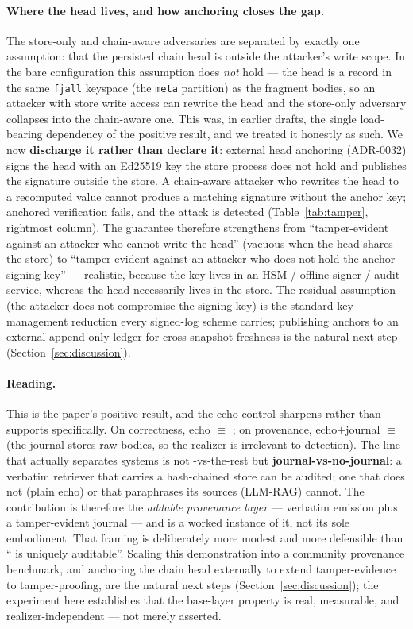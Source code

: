 \paragraph{Where the head lives, and how anchoring closes the
gap.} The store-only and chain-aware adversaries are separated by
exactly one assumption: that the persisted chain head is outside
the attacker's write scope. In the bare configuration this
assumption does \emph{not} hold --- the head is a record in the
same \texttt{fjall} keyspace (the \texttt{meta} partition) as the
fragment bodies, so an attacker with store write access can
rewrite the head and the store-only adversary collapses into the
chain-aware one. This was, in earlier drafts, the single
load-bearing dependency of the positive result, and we treated it
honestly as such. We now \textbf{discharge it rather than
declare it}: external head anchoring (ADR-0032) signs the head with
an Ed25519 key the store process does not hold and publishes the
signature outside the store. A chain-aware attacker who rewrites
the head to a recomputed value cannot produce a matching signature
without the anchor key; anchored verification fails, and the
attack is detected (Table~\ref{tab:tamper}, rightmost column). The
guarantee therefore strengthens from ``tamper-evident against an
attacker who cannot write the head'' (vacuous when the head shares
the store) to ``tamper-evident against an attacker who does not
hold the anchor signing key'' --- realistic, because the key lives
in an HSM / offline signer / audit service, whereas the head
necessarily lives in the store. The residual assumption (the
attacker does not compromise the signing key) is the standard key-
management reduction every signed-log scheme carries; publishing
anchors to an external append-only ledger for cross-snapshot
freshness is the natural next step (Section~\ref{sec:discussion}).

\paragraph{Reading.} This is the paper's positive result, and the
echo control sharpens rather than supports \hyphae{} specifically.
On correctness, echo $\equiv$ \hyphae{}; on provenance,
echo$+$journal $\equiv$ \hyphae{} (the journal stores raw bodies,
so the realizer is irrelevant to detection). The line that
actually separates systems is not \hyphae{}-vs-the-rest but
\textbf{journal-vs-no-journal}: a verbatim retriever that carries a
hash-chained store can be audited; one that does not (plain echo)
or that paraphrases its sources (LLM-RAG) cannot. The contribution
is therefore the \emph{addable provenance layer} ---
verbatim emission plus a tamper-evident journal --- and \hyphae{}
is a worked instance of it, not its sole embodiment. That framing
is deliberately more modest and more defensible than ``\hyphae{}
is uniquely auditable''. Scaling this demonstration into a
community provenance benchmark, and anchoring the chain head
externally to extend tamper-evidence to tamper-proofing, are the
natural next steps (Section~\ref{sec:discussion}); the experiment
here establishes that the base-layer property is real, measurable,
and realizer-independent --- not merely asserted.

